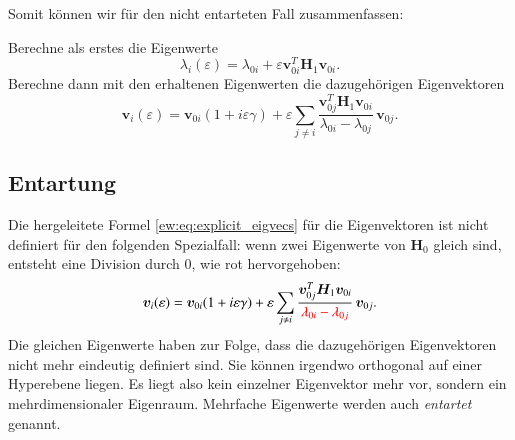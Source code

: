 Somit können wir für den nicht entarteten Fall zusammenfassen:
\begin{ewaufloesung}
    Berechne als erstes die Eigenwerte
    \begin{equation*}
        \lambda_i(\varepsilon)
        =
        \lambda_{0i} + \varepsilon \bm v_{0i}^T \bm H_1 \bm v_{0i}.
    \end{equation*}
    Berechne dann mit den erhaltenen Eigenwerten die dazugehörigen Eigenvektoren
    \begin{equation*}
        \bm v_i(\varepsilon)
        =
        \bm v_{0i} ( 1 + i \varepsilon \gamma ) + \varepsilon \sum_{j \neq i}
        \frac{\bm v_{0j}^T \bm H_1 \bm v_{0i}}{\lambda_{0i} - \lambda_{0j}}
        \, \bm v_{0j}.
    \end{equation*}
\end{ewaufloesung}

\subsection{Entartung}
%
Die hergeleitete Formel \eqref{ew:eq:explicit_eigvecs} für die Eigenvektoren ist nicht definiert für den folgenden Spezialfall:
wenn zwei Eigenwerte von $\bm H_0$ gleich sind, entsteht eine Division durch $0$, wie rot hervorgehoben:
\begin{equation*} %
    \bm v_i(\varepsilon)
    =
    \bm v_{0i} ( 1 + i \varepsilon \gamma ) + \varepsilon \sum_{j \neq i}
    \frac{\bm v_{0j}^T \bm H_1 \bm v_{0i}}{\RD{\lambda_{0i} - \lambda_{0j}}}
    \, \bm v_{0j}.
\end{equation*}
Die gleichen Eigenwerte haben zur Folge, dass die dazugehörigen Eigenvektoren nicht mehr eindeutig definiert sind.
Sie können irgendwo orthogonal auf einer Hyperebene liegen.
Es liegt also kein einzelner Eigenvektor mehr vor, sondern ein mehrdimensionaler Eigenraum.
Mehrfache Eigenwerte werden auch {\em entartet} genannt.
%
%

